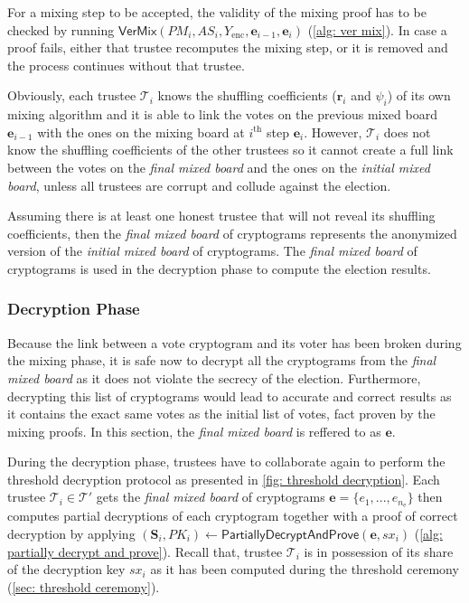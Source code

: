 For a mixing step to be accepted, the validity of the mixing proof has to be checked by running $\mathsf{VerMix}(PM_i, AS_i, Y_\mathrm{enc}, \boldsymbol{e}_{i-1}, \boldsymbol{e}_i)$ (\cref{alg: ver mix}). In case a proof fails, either that trustee recomputes the mixing step, or it is removed and the process continues without that trustee.

Obviously, each trustee $\mathcal{T}_i$ knows the shuffling coefficients ($\boldsymbol{r}_i$ and $\psi_i$) of its own mixing algorithm and it is able to link the votes on the previous mixed board $\boldsymbol{e}_{i-1}$ with the ones on the mixing board at $i^\mathrm{th}$ step $\boldsymbol{e}_i$. However, $\mathcal{T}_i$ does not know the shuffling coefficients of the other trustees so it cannot create a full link between the votes on the \textit{final mixed board} and the ones on the \textit{initial mixed board}, unless all trustees are corrupt and collude against the election.

Assuming there is at least one honest trustee that will not reveal its shuffling coefficients, then the \textit{final mixed board} of cryptograms represents the anonymized version of the \textit{initial mixed board} of cryptograms. The \textit{final mixed board} of cryptograms is used in the decryption phase to compute the election results.


\subsubsection{Decryption Phase} \label{sec: decryption phase}
Because the link between a vote cryptogram and its voter has been broken during the mixing phase, it is safe now to decrypt all the cryptograms from the \textit{final mixed board} as it does not violate the secrecy of the election. Furthermore, decrypting this list of cryptograms would lead to accurate and correct results as it contains the exact same votes as the initial list of votes, fact proven by the mixing proofs. In this section, the \textit{final mixed board} is reffered to as $\boldsymbol{e}$.

During the decryption phase, trustees have to collaborate again to perform the threshold decryption protocol as presented in \cref{fig: threshold decryption}. Each trustee \( \mathcal{T}_i \in \boldsymbol{\mathcal{T}'} \) gets the \textit{final mixed board} of cryptograms $\boldsymbol{e} = \{ e_1, ..., e_{n_\mathrm{e}} \}$ then computes partial decryptions of each cryptogram together with a proof of correct decryption by applying $(\boldsymbol{S}_i, PK_i) \gets \mathsf{PartiallyDecryptAndProve}(\boldsymbol{e}, sx_i)$ (\cref{alg: partially decrypt and prove}). Recall that, trustee $\mathcal{T}_i$ is in possession of its share of the decryption key $sx_i$ as it has been computed during the threshold ceremony (\cref{sec: threshold ceremony}).

